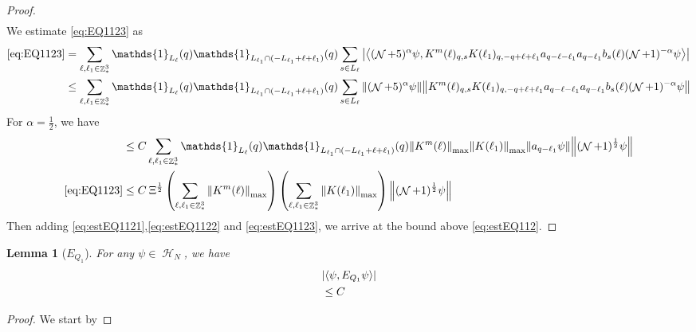 \documentclass[sn-mathphys, Numbered ,a4paper]{sn-jnl}%
\DeclareMathOperator{\Z}{\mathbb{Z}}
\DeclareMathOperator{\HH}{\mathcal{H}}
\DeclareMathOperator{\NN}{\mathcal{N}}
\newcommand{\half}{\frac{1}{2}}
\newcommand{\eva}[1]{\left\langle #1 \right\rangle}
\theoremstyle{plain}
\newtheorem{lemma}[theorem]{Lemma}
\theoremstyle{definition}
\theoremstyle{remark}
\theoremstyle{plain}
\theoremstyle{definition}
\theoremstyle{remark}
\begin{document}
\begin{proof}
\begin{align}
\end{align}
We estimate \eqref{eq:EQ1123} as 
\begin{align}
	\eqref{eq:EQ1123}&=\sum\limits_{\ell, \ell_1\in \Z^3_*} \mathds{1}_{L_{\ell}}(q) \mathds{1}_{L_{\ell_1}\cap(-L_{\ell_1}+\ell+\ell_1)}(q) \sum\limits_{s \in L_{\ell}} \abs{\eva{(\NN+5)^{\alpha} \psi, K^m(\ell)_{q,s} K(\ell_1)_{q,-q+\ell+\ell_1} a_{q-\ell-\ell_1} a_{q-\ell_1} b_{s}(\ell) (\NN+1)^{-\alpha} \psi }}\nonumber\\
	&\leq\sum\limits_{\ell, \ell_1\in \Z^3_*} \mathds{1}_{L_{\ell}}(q) \mathds{1}_{L_{\ell_1}\cap(-L_{\ell_1}+\ell+\ell_1)}(q) \sum\limits_{s \in L_{\ell}} \norm{(\NN+5)^{\alpha} \psi}\norm{ K^m(\ell)_{q,s} K(\ell_1)_{q,-q+\ell+\ell_1} a_{q-\ell-\ell_1} a_{q-\ell_1} b_{s}(\ell) (\NN+1)^{-\alpha} \psi }\nonumber
\end{align}
For $\alpha=\half$, we have
\begin{align}
	&\leq C\sum\limits_{\ell, \ell_1\in \Z^3_*} \mathds{1}_{L_{\ell}}(q) \mathds{1}_{L_{\ell_1}\cap(-L_{\ell_1}+\ell+\ell_1)}(q) \norm{K^m(\ell)}_{\mathrm{max}} \norm{K(\ell_1)}_{\mathrm{max}} \norm{a_{q-\ell_1} \psi } \norm{(\NN+1)^{\half} \psi}\nonumber\\
	\eqref{eq:EQ1123}&\leq C\: \Xi^\half  \left(\sum\limits_{\ell, \ell_1\in \Z^3_*} \norm{K^m(\ell)}_{\mathrm{max}}  \right) \left(\sum\limits_{\ell, \ell_1\in \Z^3_*} \norm{K(\ell_1)}_{\mathrm{max}} \right)  \norm{(\NN+1)^{\half} \psi}\label{eq:estEQ1123}
\end{align}
Then adding \eqref{eq:estEQ1121},\eqref{eq:estEQ1122} and \eqref{eq:estEQ1123}, we arrive at the bound above \eqref{eq:estEQ112}.
\end{proof}
\begin{lemma}[$E_{Q_1}$]
	For any $\psi \in \HH_N$, we have
	\begin{align}
		&\abs{\eva{\psi, E_{Q_1}  \psi}}\nonumber\\&\leq C
	\end{align}
\end{lemma}
\begin{proof}
	We start by
\end{proof}
\end{document}
